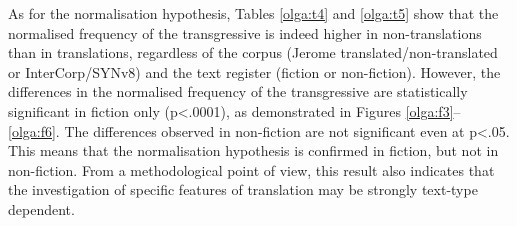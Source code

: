 \documentclass[output=paper,russian]{langsci/langscibook}
\begin{document}
\begin{table}[p]
\caption{Frequency of the transgressive (both forms) in non-fiction (n = absolute frequency, f = normalised frequency in instances per million words, CV = coefficient of variation)}\label{olga:t5}
\end{table}

As for the normalisation hypothesis, Tables \ref{olga:t4} and \ref{olga:t5} show that the normalised frequency of the transgressive is indeed higher in non-translations than in translations, regardless of the corpus (Jerome translated\slash non-translated or InterCorp\slash SYNv8) and the text register (fiction or non-fiction). However, the differences in the normalised frequency of the transgressive are statistically significant in fiction only (p<.0001), as demonstrated in Figures \ref{olga:f3}--\ref{olga:f6}. The differences observed in non\nobreakdash-fiction are not significant even at p<.05. This means that the normalisation hypothesis is confirmed in fiction, but not in non-fiction. From a methodological point of view, this result also indicates that the investigation of specific features of translation may be strongly text-type dependent.

\begin{figure}[p]
  \\
\end{figure}
\end{document}
